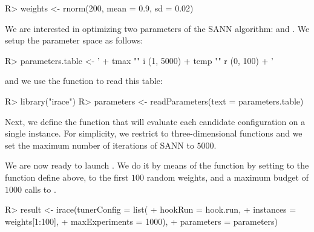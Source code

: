 \documentclass[article,a4paper,nojss,notitle]{jss}
\newcommand{\irace}{\pkg{irace}\xspace}
\begin{document}
\begin{CodeInput}
R> weights <- rnorm(200, mean = 0.9, sd = 0.02)
\end{CodeInput}

We are interested in optimizing two parameters of the SANN algorithm:  and . We setup the parameter space as follows:

\begin{CodeInput}
R> parameters.table <- '
+  tmax "" i (1, 5000)
+  temp "" r (0, 100)
+  '
\end{CodeInput}

and we use the \irace function  to read this table:

\begin{CodeInput}
R> library("irace")
R> parameters <- readParameters(text = parameters.table)
\end{CodeInput}

Next, we define the function that will evaluate each candidate
configuration on a single instance. For simplicity, we restrict to
three-dimensional functions and we set the maximum number of
iterations of SANN to $5000$.


We are now ready to launch \irace. We do it by means of the
 function by setting  to the function define
above,  to the first $100$ random weights, and a
maximum budget of $1000$ calls to .

\begin{CodeChunk}
\begin{CodeInput}
R> result <- irace(tunerConfig = list(
+                  hookRun = hook.run,
+                  instances = weights[1:100],
+                  maxExperiments = 1000),
+                  parameters = parameters)
\end{CodeInput}
\end{CodeChunk}
\end{document}
